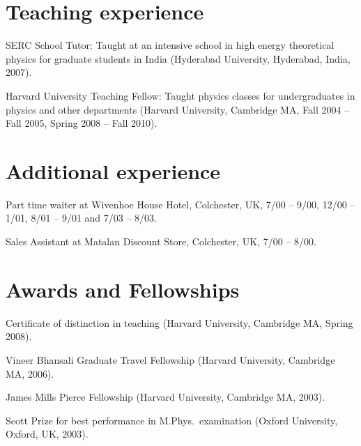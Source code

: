 \documentclass[letterpaper,10pt,notopicbreak,titleabove,plain]{simplecv}
\begin{document}
\section{Teaching experience}
\begin{topic}
  \item[SERC School Tutor:] Taught at an intensive school in high energy theoretical physics for graduate students in India (Hyderabad University, Hyderabad, India, 2007).

  \item[Harvard University Teaching Fellow:] Taught physics classes for undergraduates in physics and other departments (Harvard University, Cambridge MA, Fall 2004 -- Fall 2005, Spring 2008 -- Fall 2010).

\end{topic}

\section{Additional experience}
\begin{topic}
	\item Part time waiter at Wivenhoe House Hotel, Colchester, UK, 7/00 -- 9/00, 12/00 -- 1/01, 8/01 -- 9/01 and 7/03 -- 8/03.

	\item Sales Assistant at Matalan Discount Store, Colchester, UK, 7/00 -- 8/00.

\end{topic}

\section{Awards and Fellowships}
\begin{topic}
   \item   Certificate of distinction in teaching (Harvard University, Cambridge MA, Spring 2008).
   \item   Vineer Bhansali Graduate Travel Fellowship (Harvard University, Cambridge MA, 2006).
   \item   James Mills Pierce Fellowship (Harvard University, Cambridge MA, 2003).
   \item   Scott Prize for best performance in M.Phys.\ examination (Oxford University, Oxford, UK, 2003).
\end{topic}
\end{document}
